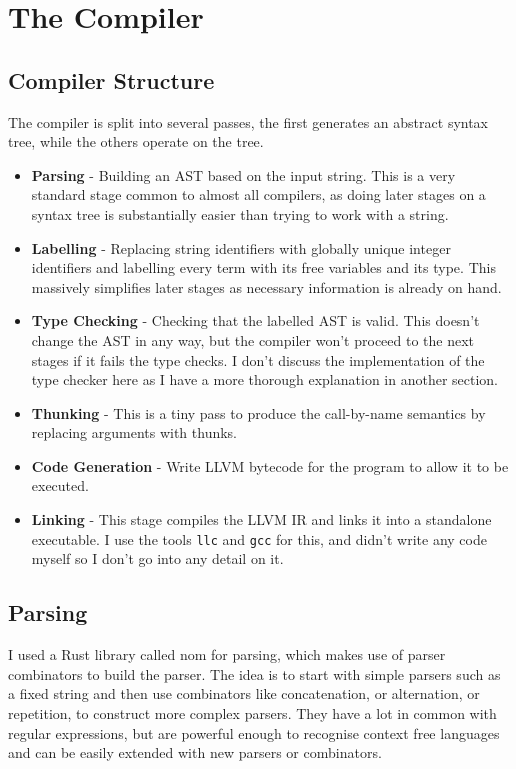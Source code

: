 \section{The Compiler}

\subsection{Compiler Structure}

The compiler is split into several passes, the first generates an abstract syntax tree, while the others
operate on the tree.

\begin{itemize}
    \item \textbf{Parsing} -
    Building an AST based on the input string.
    This is a very standard stage common to almost all compilers, as doing later stages on a syntax tree
    is substantially easier than trying to work with a string.
    \item \textbf{Labelling} -
    Replacing string identifiers with globally unique integer identifiers and
    labelling every term with its free variables and its type.
    This massively simplifies later stages as necessary information is already on hand.
    \item \textbf{Type Checking} -
    Checking that the labelled AST is valid.
    This doesn't change the AST in any way, but the compiler won't proceed to the next stages if it fails the
    type checks.
    I don't discuss the implementation of the type checker here as I have a more thorough explanation
    in another section.
    \item \textbf{Thunking} -
    This is a tiny pass to produce the call-by-name semantics by replacing arguments with thunks.
    \item \textbf{Code Generation} -
    Write LLVM bytecode for the program to allow it to be executed.
    \item \textbf{Linking} -
    This stage compiles the LLVM IR and links it into a standalone executable.
    I use the tools \texttt{llc} and \texttt{gcc} for this, and didn't write any code myself so I don't go into
    any detail on it.
\end{itemize}

\subsection{Parsing}

I used a Rust library called nom for parsing, which makes use of parser combinators to build the parser.
The idea is to start with simple parsers such as a fixed string and then use combinators like concatenation,
or alternation, or repetition, to construct more complex parsers.
They have a lot in common with regular expressions, but are powerful enough to recognise context free languages
and can be easily extended with new parsers or combinators.

